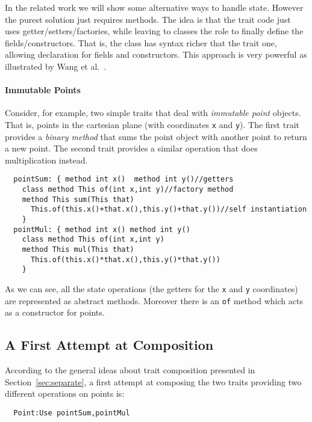 In the related work we will show some alternative ways to handle
state.  However the purest solution just requires methods. The idea is
that the trait code just uses getter/setters/factories, while leaving
to classes the role to finally define the fields/constructors. That
is, the class has syntax richer that the trait one, allowing
declaration for fields and constructors.  This approach is very
powerful as illustrated by Wang et al.~\cite{wang2016classless}.

\paragraph{Immutable Points} Consider, for example, two simple 
traits that deal with \emph{immutable point} objects. That is, points
in the cartesian plane (with coordinates \lstinline{x} and
\lstinline{y}). The first trait provides a \emph{binary method} that 
sums the point object with another point to return a new point. 
The second trait provides a similar operation that does multiplication 
instead.
 
\begin{lstlisting}
  pointSum: { method int x()  method int y()//getters
    class method This of(int x,int y)//factory method
    method This sum(This that)
      This.of(this.x()+that.x(),this.y()+that.y())//self instantiation
    }
  pointMul: { method int x() method int y()
    class method This of(int x,int y)
    method This mul(This that)
      This.of(this.x()*that.x(),this.y()*that.y())
    }
\end{lstlisting}

\noindent As we can see, all the state operations (the getters for the 
\lstinline{x} and \lstinline{y} coordinates) are represented as abstract methods.
Moreover there is an \lstinline{of} method which acts as a constructor
for points. 

\subsection{A First Attempt at Composition}
According to the general ideas about trait composition presented in
Section~\ref{sec:separate}, a first attempt at composing the two traits providing
two different operations on points is:
\begin{lstlisting}
  Point:Use pointSum,pointMul
\end{lstlisting}  

